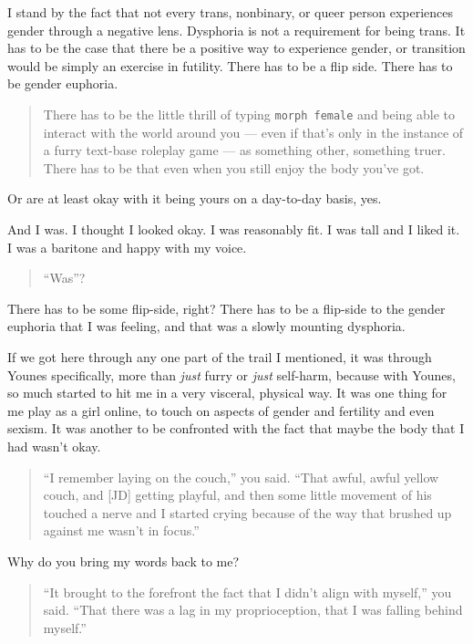I stand by the fact that not every trans, nonbinary, or queer person experiences gender through a negative lens. Dysphoria is not a requirement for being trans. It has to be the case that there be a positive way to experience gender, or transition would be simply an exercise in futility. There has to be a flip side. There has to be gender euphoria.

\begin{quote}
There has to be the little thrill of typing \texttt{morph\ female} and being able to interact with the world around you --- even if that's only in the instance of a furry text-base roleplay game --- as something other, something truer. There has to be that even when you still enjoy the body you've got.
\end{quote}

Or are at least okay with it being yours on a day-to-day basis, yes.

And I was. I thought I looked okay. I was reasonably fit. I was tall and I liked it. I was a baritone and happy with my voice.

\begin{quote}
``Was''?
\end{quote}

There has to be some flip-side, right? There has to be a flip-side to the gender euphoria that I was feeling, and that was a slowly mounting dysphoria.

If we got here through any one part of the trail I mentioned, it was through Younes specifically, more than \emph{just} furry or \emph{just} self-harm, because with Younes, so much started to hit me in a very visceral, physical way. It was one thing for me play as a girl online, to touch on aspects of gender and fertility and even sexism. It was another to be confronted with the fact that maybe the body that I had wasn't okay.

\begin{quote}
``I remember laying on the couch,'' you said. ``That awful, awful yellow couch, and {[}JD{]} getting playful, and then some little movement of his touched a nerve and I started crying because of the way that brushed up against me wasn't in focus.''
\end{quote}

Why do you bring my words back to me?

\begin{quote}
``It brought to the forefront the fact that I didn't align with myself,'' you said. ``That there was a lag in my proprioception, that I was falling behind myself.''
\end{quote}

